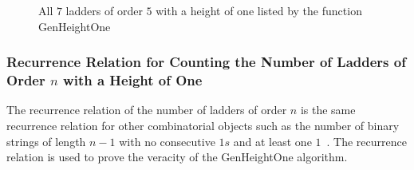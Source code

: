 \begin{figure}[h]
\begin{center}
        \end{center}
        \caption{All $7$ ladders of order $5$ with a height of one listed by the function {\sc GenHeightOne}}
        \label{Fig:GenHeightOne}
   \end{figure}

   \subsubsection{Recurrence Relation for Counting the Number of Ladders of Order $n$ with a Height of One}
   The recurrence relation of the number of ladders of order $n$ is the same recurrence relation for 
   other combinatorial objects such as the number of binary strings of length $n-1$ with no consecutive $1s$ 
   and at least one $1$~\cite{A8}\cite{A11}. The recurrence relation is used to prove the veracity of the {\sc GenHeightOne} algorithm.\par 
   
